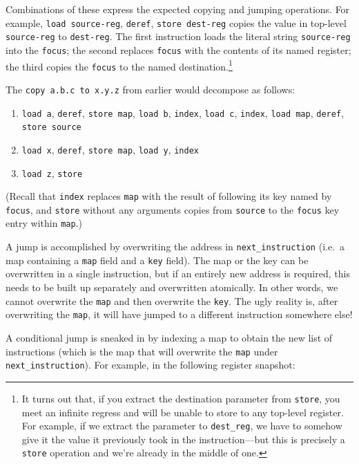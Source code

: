 \documentclass[ twoside,openright,titlepage,numbers=noenddot,headinclude,footinclude,cleardoublepage=empty,abstract=on,
                BCOR=5mm,paper=a4,fontsize=11pt
                ]{scrreprt}
\providecommand{\tightlist}{}\newenvironment{longtable}[2]{\begin{tabular}}{\end{tabular}}
\theoremstyle{definition}
\begin{document}
Combinations of these express the expected copying and jumping
operations. For example, \texttt{load\ source-reg}, \texttt{deref},
\texttt{store\ dest-reg} copies the value in top-level
\texttt{source-reg} to \texttt{dest-reg}. The first instruction loads
the literal string \texttt{source-reg} into the \texttt{focus}; the
second replaces \texttt{focus} with the contents of its named register;
the third copies the \texttt{focus} to the named destination.\footnote{It
  turns out that, if you extract the destination parameter from
  \texttt{store}, you meet an infinite regress and will be unable to
  store to any top-level register. For example, if we extract the
  parameter to \texttt{dest\_reg}, we have to somehow give it the value
  it previously took in the instruction---but this is precisely a
  \texttt{store} operation and we're already in the middle of one.}

The \texttt{copy\ a.b.c\ to\ x.y.z} from earlier would decompose as
follows:

\begin{enumerate}
\def\labelenumi{\arabic{enumi}.}
\tightlist
\item
  \texttt{load\ a}, \texttt{deref}, \texttt{store\ map},
  \texttt{load\ b}, \texttt{index}, \texttt{load\ c}, \texttt{index},
  \texttt{load\ map}, \texttt{deref}, \texttt{store\ source}
\item
  \texttt{load\ x}, \texttt{deref}, \texttt{store\ map},
  \texttt{load\ y}, \texttt{index}
\item
  \texttt{load\ z}, \texttt{store}
\end{enumerate}

(Recall that \texttt{index} replaces \texttt{map} with the result of
following its key named by \texttt{focus}, and \texttt{store} without
any arguments copies from \texttt{source} to the \texttt{focus} key
entry within \texttt{map}.)

A jump is accomplished by overwriting the address in
\texttt{next\_instruction} (i.e.~a map containing a \texttt{map} field
and a \texttt{key} field). The map or the key can be overwritten in a
single instruction, but if an entirely new address is required, this
needs to be built up separately and overwritten atomically. In other
words, we cannot overwrite the \texttt{map} and then overwrite the
\texttt{key}. The ugly reality is, after overwriting the \texttt{map},
it will have jumped to a different instruction somewhere else!

A conditional jump is sneaked in by indexing a map to obtain the new
list of instructions (which is the map that will overwrite the
\texttt{map} under \texttt{next\_instruction}). For example, in the
following register snapshot:
\end{document}
